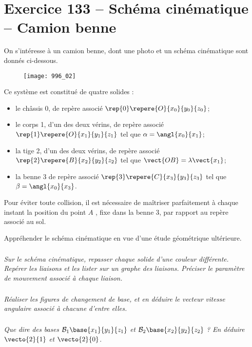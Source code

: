 \section*{Exercice 133 -- Schéma cinématique -- Camion benne}
\setcounter{exo}{0}
On s’intéresse à un camion benne, dont une photo et un schéma cinématique sont donnés ci-dessous.



\begin{figure}[H]
\centering
\texttt{[image: 996\_02]}
\end{figure}

Ce système est constitué de quatre solides :
\begin{itemize}
\item le châssis 0, de repère associé  $\rep{0}\repere{O}{x_0}{y_0}{z_0}$;
\item le corps 1, d'un des deux vérins, de repère associé   $\rep{1}\repere{O}{x_1}{y_1}{z_1}$ tel que $\alpha = \angl{x_0}{x_1}$;
\item la tige 2, d'un des deux vérins, de repère associé   $\rep{2}\repere{B}{x_2}{y_2}{z_2}$ tel que $\vect{OB}=\lambda \vect{x_1}$;
\item la benne 3 de repère associé  $\rep{3}\repere{C}{x_3}{y_3}{z_3}$ tel que $\beta = \angl{x_0}{x_3}$.
\end{itemize}

Pour éviter toute collision, il est nécessaire de maîtriser parfaitement à chaque instant la position du point $A$ , fixe dans la
benne 3, par rapport au repère associé au sol.

 \begin{obj}
Appréhender le schéma cinématique en vue d’une étude géométrique ultérieure.
 \end{obj}



\subparagraph{}
\textit{Sur le schéma cinématique, repasser chaque solide d’une couleur différente. Repérer les liaisons et les lister
sur un graphe des liaisons. Préciser le paramètre de mouvement associé à chaque liaison.}
\ifprof
\begin{corrige}
\end{corrige}
\else
\fi


\subparagraph{}
\textit{Réaliser les figures de changement de base, et en déduire le vecteur vitesse angulaire associé à chacune
d’entre elles.}
\ifprof
\begin{corrige}
\end{corrige}
\else
\fi


\subparagraph{}
\textit{Que dire des bases $\mathcal{B}_1\base{x_1}{y_1}{z_1}$ et  $\mathcal{B}_2\base{x_2}{y_2}{z_2}$ ? En déduire $\vecto{2}{1}$ et $\vecto{2}{0}$.}
\ifprof
\begin{corrige}
\end{corrige}
\else
\fi
